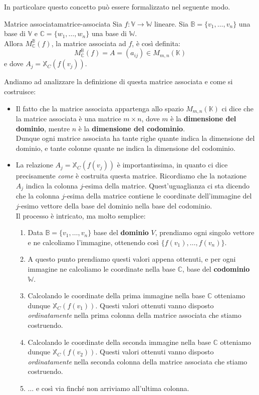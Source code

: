 \documentclass[12pt]{report}
\newcommand{\C}{\mathbb{C}}
\newcommand{\K}{\mathbb{K}}
\newcommand{\V}{\mathbb{V}}
\newcommand{\W}{\mathbb{W}}
\newcommand{\vectors}[1]{#1_1, \dots, #1_n}
\newcommand{\associatedmatrix}[2]{M^{\mathbb{#1}}_{\mathbb{#2}}}
\begin{document}
	In particolare questo concetto può essere formalizzato nel seguente modo.
	\begin{definizione}{Matrice associata}{matrice-associata}
		Sia $f: \V \to \W$ lineare. Sia $\mathbb{B} = \{\vectors{v}\}$ una base di $\V$ e $\mathbb{C} = \{\vectors{w}\}$ una base di $\W$.\\
		Allora $\associatedmatrix{B}{C}(f)$, la matrice associata ad $f$, è così definita:
		\[
			M^{\mathbb{B}}_{\mathbb{C}}(f) = A = (a_{ij}) \in M_{m,n}(\K)
		\]
		e dove $A_j = \mathbb{X}_C(f(v_j))$.
	\end{definizione}
	
	Andiamo ad analizzare la definizione di questa matrice associata e come si costruisce:
	\begin{itemize}
		\item Il fatto che la matrice associata appartenga allo spazio $M_{m,n}(\K)$ ci dice che la matrice associata è una matrice $m \times n$, dove $m$ è la \textbf{dimensione del dominio}, mentre $n$ è la \textbf{dimensione del codominio}.\\
		Dunque ogni matrice associata ha tante righe quante indica la dimensione del dominio, e tante colonne quante ne indica la dimensione del codominio.
		\item La relazione $A_j = \mathbb{X}_C(f(v_j))$ è importantissima, in quanto ci dice precisamente \textit{come} è costruita questa matrice. Ricordiamo che la notazione $A_j$ indica la colonna $j$-esima della matrice. Quest'uguaglianza ci sta dicendo che la colonna $j$-esima della matrice contiene le coordinate dell'immagine del $j$-esimo vettore della base del dominio nella base del codominio.\\
		Il processo è intricato, ma molto semplice:
		
		\begin{enumerate}
			\item Data $\mathbb{B} = \{\vectors{v}\}$ base del \textbf{dominio} $V$, prendiamo ogni singolo vettore e ne calcoliamo l'immagine, ottenendo così $\{f(v_1), \dots, f(v_n)\}$.
			\item A questo punto prendiamo questi valori appena ottenuti, e per ogni immagine ne calcoliamo le coordinate nella base $\C$, base del \textbf{codominio} $\W$.
			\item Calcolando le coordinate della prima immagine nella base $\C$ otteniamo dunque $\mathbb{X}_C(f(v_1))$. Questi valori ottenuti vanno disposto \textit{ordinatamente} nella prima colonna della matrice associata che stiamo costruendo.
			\item Calcolando le coordinate della seconda immagine nella base $\C$ otteniamo dunque $\mathbb{X}_C(f(v_2))$. Questi valori ottenuti vanno disposto \textit{ordinatamente} nella seconda colonna della matrice associata che stiamo costruendo.
			\item $\dots$ e così via finché non arriviamo all'ultima colonna.
		\end{enumerate}
		

\end{itemize}
\end{document}
